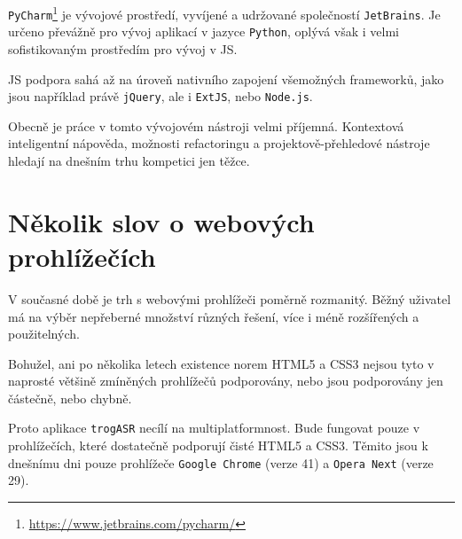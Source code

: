 \verb|PyCharm|\footnote{\url{https://www.jetbrains.com/pycharm/}} je vývojové prostředí, vyvíjené a udržované společností \verb|JetBrains|. Je určeno převážně pro vývoj aplikací v jazyce \verb|Python|, oplývá však i velmi sofistikovaným prostředím pro vývoj v JS.

JS podpora sahá až na úroveň nativního zapojení všemožných frameworků, jako jsou například právě \verb|jQuery|, ale i \verb|ExtJS|, nebo \verb|Node.js|.

Obecně je práce v tomto vývojovém nástroji velmi příjemná. Kontextová inteligentní nápověda, možnosti refactoringu a projektově-přehledové nástroje hledají na dnešním trhu kompetici jen těžce.

\section{Několik slov o webových prohlížečích}

V současné době je trh s webovými prohlížeči poměrně rozmanitý. Běžný uživatel má na výběr nepřeberné množství různých řešení, více i méně rozšířených a použitelných.

Bohužel, ani po několika letech existence norem HTML5 a CSS3 nejsou tyto v naprosté většině zmíněných prohlížečů podporovány, nebo jsou podporovány jen částečně, nebo chybně.

Proto aplikace \verb|trogASR| necílí na multiplatformnost. Bude fungovat pouze v prohlížečích, které dostatečně podporují čisté HTML5 a CSS3. Těmito jsou k dnešnímu dni pouze prohlížeče \verb|Google Chrome| (verze 41) a \verb|Opera Next| (verze 29).